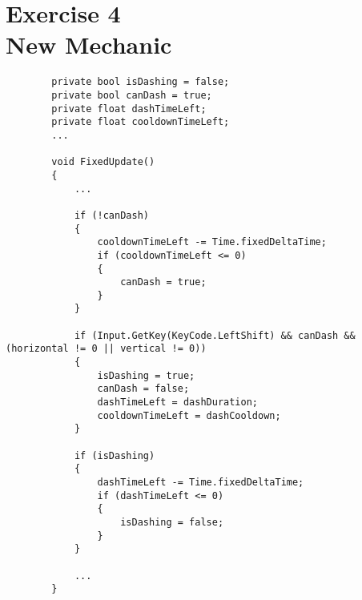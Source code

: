 \section[Exercise 4. New Mechanic]{Exercise 4\\ {\large New Mechanic}}

    \begin{verbatim}
        private bool isDashing = false;
        private bool canDash = true;
        private float dashTimeLeft;
        private float cooldownTimeLeft;
        ...

        void FixedUpdate()
        {
            ...

            if (!canDash)
            {
                cooldownTimeLeft -= Time.fixedDeltaTime;
                if (cooldownTimeLeft <= 0)
                {
                    canDash = true;
                }
            }

            if (Input.GetKey(KeyCode.LeftShift) && canDash && (horizontal != 0 || vertical != 0))
            {
                isDashing = true;
                canDash = false;
                dashTimeLeft = dashDuration;
                cooldownTimeLeft = dashCooldown;
            }

            if (isDashing)
            {
                dashTimeLeft -= Time.fixedDeltaTime;
                if (dashTimeLeft <= 0)
                {
                    isDashing = false;
                }
            }

            ...
        }

    \end{verbatim}